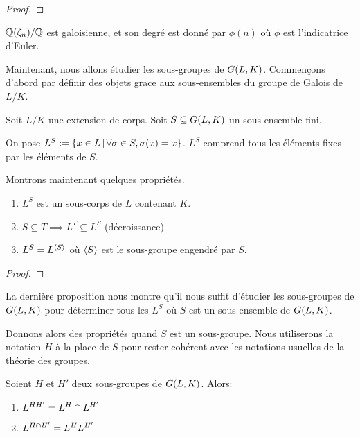\ifdefined\outputproof
\begin{proof}

\end{proof}
\fi

\begin{exemple}
	$\mathbb{Q}(\zeta_{n})/\mathbb{Q}$ est galoisienne, et son degré est donné par
	$\phi(n)$ où $\phi$ est l'indicatrice d'Euler.
\end{exemple}

Maintenant, nous allons étudier les sous-groupes de $G(L, K)$.
Commençons d'abord par définir des objets grace aux sous-ensembles du groupe de
Galois de $L/K$.

\begin{definition}
	Soit $L/K$ une extension de corps.
	Soit $S \subseteq G(L, K)$ un sous-ensemble fini.

	On pose $L^{S} := \left\{x \in L \, | \, \forall \sigma \in S, \sigma(x) = x \right\}$.
	$L^{S}$ comprend tous les éléments fixes par les éléments de $S$.
\end{definition}

Montrons maintenant quelques propriétés.

\begin{proposition}
	\label{prop:correspondance_subgroup_to_subfield}
	\begin{enumerate}
		\item $L^{S}$ est un sous-corps de $L$ contenant $K$.
		\item $S \subseteq T \implies L^{T} \subseteq L^{S}$ (décroissance)
		\item $L^{S} = L^{\left<S\right>}$ où $\left<S\right>$ est le
			sous-groupe engendré par $S$.
	\end{enumerate}
\end{proposition}

\ifdefined\outputproof
\begin{proof}

\end{proof}
\fi

La dernière proposition nous montre qu'il nous suffit d'étudier les sous-groupes
de $G(L, K)$ pour déterminer tous les $L^{S}$ où $S$ est un
sous-ensemble de $G(L, K)$.

Donnons alors des propriétés quand $S$ est un sous-groupe. Nous utiliserons la
notation $H$ à la place de $S$ pour rester cohérent avec les notations usuelles
de la théorie des groupes.

\begin{proposition}
	Soient $H$ et $H'$ deux sous-groupes de $G(L, K)$. Alors:
	\begin{enumerate}
		\item $L^{HH'} = L^{H} \cap L^{H'}$
		\item $L^{H \cap H'} = L^{H} L^{H'}$
	\end{enumerate}
\end{proposition}

